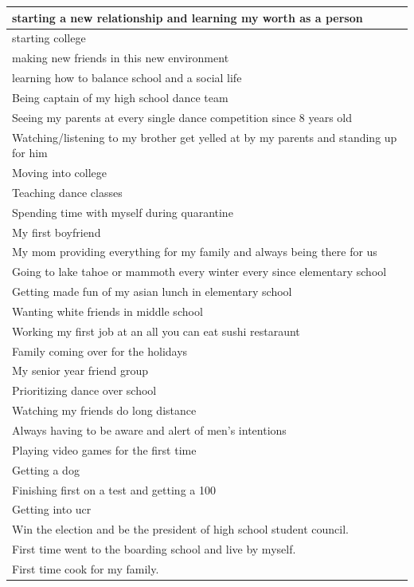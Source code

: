 \documentclass[
  .7em,
  letterpaper,
  DIV=11,
  numbers=noendperiod]{scrartcl}
\begin{document}
\begin{table}
\begin{tabular}{l}
starting a new relationship and learning my worth as a person\\
\hline
starting college\\
\hline
making new friends in this new environment\\
\hline
learning how to balance school and a social life\\
\hline
Being captain of my high school dance team\\
\hline
Seeing my parents at every single dance competition since 8 years old\\
\hline
Watching/listening to my brother get yelled at by my parents and standing up for him\\
\hline
Moving into college\\
\hline
Teaching dance classes\\
\hline
Spending time with myself during quarantine\\
\hline
My first boyfriend\\
\hline
My mom providing everything for my family and always being there for us\\
\hline
Going to lake tahoe or mammoth every winter every since elementary school\\
\hline
Getting made fun of my asian lunch in elementary school\\
\hline
Wanting white friends in middle school\\
\hline
Working my first job at an all you can eat sushi restaraunt\\
\hline
Family coming over for the holidays\\
\hline
My senior year friend group\\
\hline
Prioritizing dance over school\\
\hline
Watching my friends do long distance\\
\hline
Always having to be aware and alert of men's intentions\\
\hline
Playing video games for the first time\\
\hline
Getting a dog\\
\hline
Finishing first on a test and getting a 100\\
\hline
Getting into ucr\\
\hline
Win the election and be the president of high school student council.\\
\hline
First time went to the boarding school and live by myself.\\
\hline
First time cook for my family.\\

\end{tabular}
\end{table}
\end{document}

